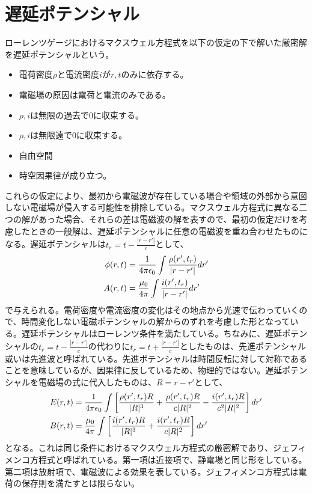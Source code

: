     \section{遅延ポテンシャル}
        ローレンツゲージにおけるマクスウェル方程式を以下の仮定の下で解いた厳密解を遅延ポテンシャルという。
        \begin{itemize}
        	\item 電荷密度$\rho$と電流密度$i$が$r,t$のみに依存する。
        	\item 電磁場の原因は電荷と電流のみである。
        	\item $\rho,i$は無限の過去で0に収束する。
        	\item $\rho,i$は無限遠で0に収束する。
        	\item 自由空間
        	\item 時空因果律が成り立つ。
        \end{itemize}
        これらの仮定により、最初から電磁波が存在している場合や領域の外部から意図しない電磁場が侵入する可能性を排除している。マクスウェル方程式に異なる二つの解があった場合、それらの差は電磁波の解を表すので、最初の仮定だけを考慮したときの一般解は、遅延ポテンシャルに任意の電磁波を重ね合わせたものになる。遅延ポテンシャルは$t_r = t-\frac{|r-r'|}{c}$として、
        \begin{align*}
            \phi(r,t) &= \frac{1}{4\pi\epsilon_0}
            \int \frac{\rho(r',t_r)}{|r-r'|}dr'\\
            A(r,t) &= \frac{\mu_0}{4\pi}
            \int \frac{i(r',t_r)}{|r-r'|}dr'
        \end{align*}
        で与えられる。電荷密度や電流密度の変化はその地点から光速で伝わっていくので、時間変化しない電磁ポテンシャルの解からのずれを考慮した形となっている。遅延ポテンシャルはローレンツ条件を満たしている。ちなみに、遅延ポテンシャルの$t_r = t-\frac{|r-r'|}{c}$の代わりに$t_r = t+\frac{|r-r'|}{c}$としたものは、先進ポテンシャル或いは先進波と呼ばれている。先進ポテンシャルは時間反転に対して対称であることを意味しているが、因果律に反しているため、物理的ではない。遅延ポテンシャルを電磁場の式に代入したものは、$R = r-r'$として、
        \begin{align*}
            E(r,t) &= \frac{1}{4\pi\epsilon_0}
            \int \left[\frac{\rho(r',t_r)R}{|R|^3}
            +\frac{\rho(r',t_r)R}{c|R|^2}-\frac{i(r',t_r)R}{c^2|R|^2} \right]dr'\\
            B(r,t) &= \frac{\mu_0}{4\pi}
            \int \left[\frac{i(r',t_r)R}{|R|^3}
            +\frac{i(r',t_r)R}{c|R|^2} \right]dr'
        \end{align*}
        となる。これは同じ条件におけるマクスウェル方程式の厳密解であり、ジェフィメンコ方程式と呼ばれている。第一項は近接項で、静電場と同じ形をしている。第二項は放射項で、電磁波による効果を表している。ジェフィメンコ方程式は電荷の保存則を満たすとは限らない。
